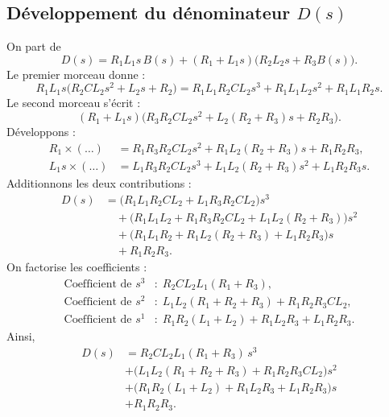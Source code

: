 \documentclass[12pt,a4paper]{article}
\begin{document}
\subsection{Développement du dénominateur \(D(s)\)}
On part de
\begin{equation}
D(s) = R_1 L_1 s\,B(s) + (R_1 + L_1 s)\bigl( R_2 L_2 s + R_3 B(s) \bigr) .
\label{eq:D0}
\end{equation}
Le premier morceau donne :
\[
R_1 L_1 s \bigl( R_2 C L_2 s^2 + L_2 s + R_2 \bigr)
= R_1 L_1 R_2 C L_2 s^3 + R_1 L_1 L_2 s^2 + R_1 L_1 R_2 s .
\]
Le second morceau s'écrit :
\[
(R_1 + L_1 s)\bigl( R_3 R_2 C L_2 s^2 + L_2(R_2+R_3) s + R_2 R_3 \bigr) .
\]
Développons :
\begin{align*}
R_1 \times (\dots) &= R_1 R_3 R_2 C L_2 s^2 + R_1 L_2(R_2+R_3) s + R_1 R_2 R_3 ,\\
L_1 s \times (\dots) &= L_1 R_3 R_2 C L_2 s^3 + L_1 L_2(R_2+R_3) s^2 + L_1 R_2 R_3 s .
\end{align*}
Additionnons les deux contributions :
\begin{align}
D(s) &= \bigl( R_1 L_1 R_2 C L_2 + L_1 R_3 R_2 C L_2 \bigr) s^3 \nonumber\\
     &\quad + \bigl( R_1 L_1 L_2 + R_1 R_3 R_2 C L_2 + L_1 L_2(R_2+R_3) \bigr) s^2 \nonumber\\
     &\quad + \bigl( R_1 L_1 R_2 + R_1 L_2(R_2+R_3) + L_1 R_2 R_3 \bigr) s \nonumber\\
     &\quad + R_1 R_2 R_3 .
\end{align}
On factorise les coefficients :
\begin{align}
\text{Coefficient de } s^3 &: \; R_2 C L_2 L_1 (R_1 + R_3) , \nonumber\\
\text{Coefficient de } s^2 &: \; L_1 L_2 (R_1 + R_2 + R_3) + R_1 R_2 R_3 C L_2 , \nonumber\\
\text{Coefficient de } s^1 &: \; R_1 R_2 (L_1 + L_2) + R_1 L_2 R_3 + L_1 R_2 R_3 .
\end{align}
Ainsi,
\begin{equation}
\boxed{
\begin{aligned}
D(s) &= R_2 C L_2 L_1 (R_1+R_3) \, s^3 \\
     &+ \bigl( L_1 L_2 (R_1+R_2+R_3) + R_1 R_2 R_3 C L_2 \bigr) s^2 \\
     &+ \bigl( R_1 R_2 (L_1+L_2) + R_1 L_2 R_3 + L_1 R_2 R_3 \bigr) s \\
     &+ R_1 R_2 R_3 .
\end{aligned}}
\label{eq:D}
\end{equation}
\end{document}
